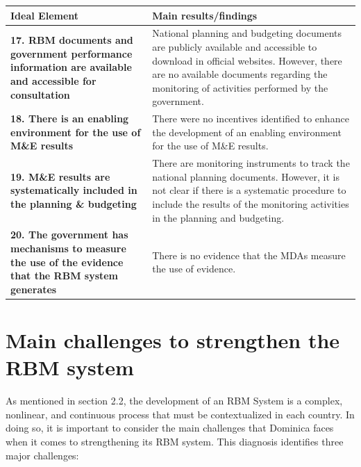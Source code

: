 \documentclass[
  10pt,
]{book}
\begin{document}
\begingroup\fontsize{12}{14}\selectfont

\begin{tabu} to 
\hline
Ideal Element & Main results/findings\\
\hline
\textbf{17. RBM documents and government performance information are available and accessible for consultation} & National planning and budgeting documents are publicly available and accessible to download in official websites. However, there are no available documents regarding the monitoring of activities performed by the government.\\
\hline
\textbf{18. There is an enabling environment for the use of M\&E results} & There were no incentives identified to enhance the development of an enabling environment for the use of M\&E results.\\
\hline
\textbf{19. M\&E results are systematically included in the planning \& budgeting} & There are monitoring instruments to track the national planning documents. However, it is not clear if there is a systematic procedure to include the results of the monitoring activities in the planning and budgeting.\\
\hline
\textbf{20. The government has mechanisms to measure the use of the evidence that the RBM system generates} & There is no evidence that the MDAs measure the use of evidence.\\
\hline
\end{tabu}
\endgroup{}

\hypertarget{main-challenges-to-strengthen-the-rbm-system}{%
\section{Main challenges to strengthen the RBM system}\label{main-challenges-to-strengthen-the-rbm-system}}

As mentioned in section 2.2, the development of an RBM System is a complex, nonlinear, and continuous process that must be contextualized in each country. In doing so, it is important to consider the main challenges that Dominica faces when it comes to strengthening its RBM system. This diagnosis identifies three major challenges:
\end{document}

